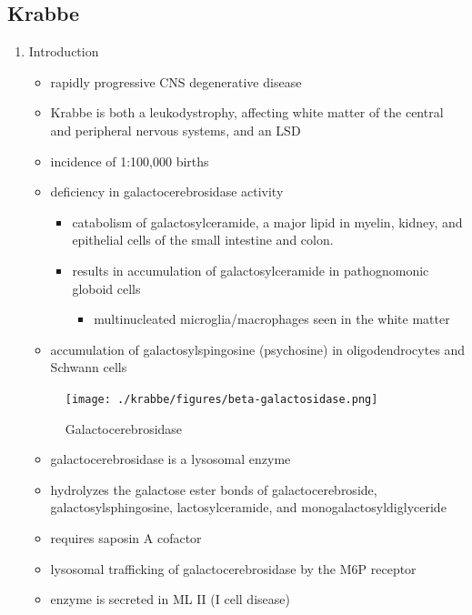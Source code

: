 \documentclass{scrartcl}
\begin{document}
\subsection{Krabbe}
\label{sec:org09570ce}
\begin{enumerate}
\item Introduction
\label{sec:org4bf02c1}
\begin{itemize}
\item rapidly progressive CNS degenerative disease
\item Krabbe is both a leukodystrophy, affecting white matter of the central
and peripheral nervous systems, and an LSD

\item incidence of 1:100,000 births
\item deficiency in galactocerebrosidase activity
\begin{itemize}
\item catabolism of galactosylceramide, a major lipid in myelin, kidney, and epithelial cells of the small intestine and colon.
\item results in accumulation of galactosylceramide in pathognomonic globoid cells
\begin{itemize}
\item multinucleated microglia/macrophages seen in the white matter
\end{itemize}
\end{itemize}
\item accumulation of galactosylspingosine (psychosine) in oligodendrocytes and Schwann cells
\end{itemize}

\begin{figure}[htbp]
\centering
\texttt{[image: ./krabbe/figures/beta-galactosidase.png]}
\caption{\label{fig:orgd0203c6}
Galactocerebrosidase}
\end{figure}

\begin{itemize}
\item galactocerebrosidase is a lysosomal enzyme
\item hydrolyzes the galactose ester bonds of galactocerebroside, galactosylsphingosine, lactosylceramide, and monogalactosyldiglyceride
\item requires saposin A cofactor
\item lysosomal trafficking of galactocerebrosidase by the M6P receptor
\item enzyme is secreted in ML II (I cell disease)
\end{itemize}


\end{enumerate}
\end{document}
